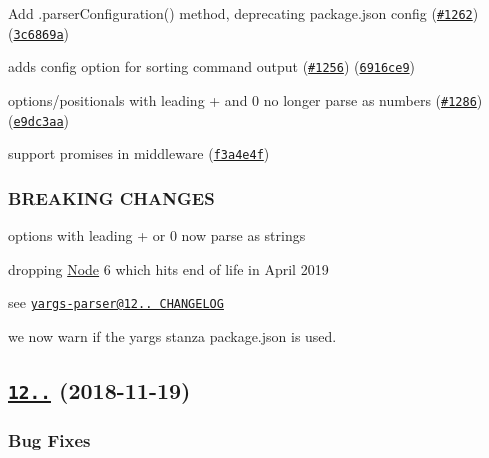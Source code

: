 \begin{DoxyItemize}
\item Add {\ttfamily .parser\+Configuration()} method, deprecating package.\+json config (\href{https://github.com/yargs/yargs/issues/1262}{\tt \#1262}) (\href{https://github.com/yargs/yargs/commit/3c6869a}{\tt 3c6869a})
\item adds config option for sorting command output (\href{https://github.com/yargs/yargs/issues/1256}{\tt \#1256}) (\href{https://github.com/yargs/yargs/commit/6916ce9}{\tt 6916ce9})
\item options/positionals with leading \textquotesingle{}+\textquotesingle{} and \textquotesingle{}0\textquotesingle{} no longer parse as numbers (\href{https://github.com/yargs/yargs/issues/1286}{\tt \#1286}) (\href{https://github.com/yargs/yargs/commit/e9dc3aa}{\tt e9dc3aa})
\item support promises in middleware (\href{https://github.com/yargs/yargs/commit/f3a4e4f}{\tt f3a4e4f})
\end{DoxyItemize}

\subsubsection*{B\+R\+E\+A\+K\+I\+NG C\+H\+A\+N\+G\+ES}


\begin{DoxyItemize}
\item options with leading \textquotesingle{}+\textquotesingle{} or \textquotesingle{}0\textquotesingle{} now parse as strings
\item dropping \mbox{\hyperlink{classNode}{Node}} 6 which hits end of life in April 2019
\item see \href{https://github.com/yargs/yargs-parser/blob/master/CHANGELOG.md#breaking-changes}{\tt yargs-\/parser@12.. C\+H\+A\+N\+G\+E\+L\+OG}
\item we now warn if the yargs stanza package.\+json is used.
\end{DoxyItemize}

\label{_12.0.5}%
 \subsection*{\href{https://github.com/yargs/yargs/compare/v12.0.4...v12.0.5}{\tt 12..} (2018-\/11-\/19)}

\subsubsection*{Bug Fixes}


